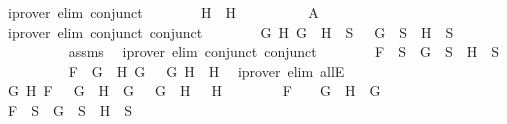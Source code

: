 \begin{isabellebody}
\ {\isacharparenleft}iprover\ elim{\isacharcolon}\ conjunct{}{\isacharparenright}\isanewline
\ \ \ \ \ \ \isamarkupfalse%
\ {\isachardoublequoteopen}H\ {\isacharequal}\ H{}{\isachardoublequoteclose}\isanewline
\ \ \ \ \ \ \ \ \isamarkupfalse%
\ A{}\ \isamarkupfalse%
\ {\isacharparenleft}iprover\ elim{\isacharcolon}\ conjunct{}\ conjunct{}{\isacharparenright}\isanewline
\ \ \ \ \ \ \isamarkupfalse%
\ {\isachardoublequoteopen}{\isasymforall}G\ H{\isachardot}\ G\ \isactrlbold {\isasymrightarrow}\ H\ {\isasymin}\ S\ {\isasymlongrightarrow}\ \isactrlbold {\isasymnot}\ G\ {\isasymin}\ S\ {\isasymor}\ H\ {\isasymin}\ S{\isachardoublequoteclose}\isanewline
\ \ \ \ \ \ \ \ \isamarkupfalse%
\ assms\ \isamarkupfalse%
\ {\isacharparenleft}iprover\ elim{\isacharcolon}\ conjunct{}\ conjunct{}{\isacharparenright}\isanewline
\ \ \ \ \ \ \isamarkupfalse%
\ {\isachardoublequoteopen}F\ {\isasymin}\ S\ {\isasymlongrightarrow}\ G\ {\isasymin}\ S\ {\isasymor}\ H\ {\isasymin}\ S{\isachardoublequoteclose}\isanewline
\ \ \ \ \ \ \ \ \isamarkupfalse%
\ {\isacartoucheopen}F\ {\isacharequal}\ G{}\ \isactrlbold {\isasymrightarrow}\ H{}{\isacartoucheclose}\ {\isacartoucheopen}G\ {\isacharequal}\ \isactrlbold {\isasymnot}\ G{}{\isacartoucheclose}\ {\isacartoucheopen}H\ {\isacharequal}\ H{}{\isacartoucheclose}\ \isamarkupfalse%
\ {\isacharparenleft}iprover\ elim{\isacharcolon}\ allE{\isacharparenright}\isanewline
\ \ \ \ \isamarkupfalse%
\isanewline
\ \ \ \ \ \ \isamarkupfalse%
\ {\isachardoublequoteopen}{\isacharparenleft}{\isasymexists}G{}\ H{}{\isachardot}\ F\ {\isacharequal}\ \isactrlbold {\isasymnot}\ {\isacharparenleft}G{}\ \isactrlbold {\isasymand}\ H{}{\isacharparenright}\ {\isasymand}\ G\ {\isacharequal}\ \isactrlbold {\isasymnot}\ G{}\ {\isasymand}\ H\ {\isacharequal}\ \isactrlbold {\isasymnot}\ H{}{\isacharparenright}\ {\isasymor}\ \isanewline
\ \ \ \ \ \ F\ {\isacharequal}\ \isactrlbold {\isasymnot}\ {\isacharparenleft}\isactrlbold {\isasymnot}\ G{\isacharparenright}\ {\isasymand}\ H\ {\isacharequal}\ G{\isachardoublequoteclose}\isanewline
\ \ \ \ \ \ \isamarkupfalse%
\ {\isachardoublequoteopen}F\ {\isasymin}\ S\ {\isasymlongrightarrow}\ G\ {\isasymin}\ S\ {\isasymor}\ H\ {\isasymin}\ S{\isachardoublequoteclose}\isanewline

\end{isabellebody}
